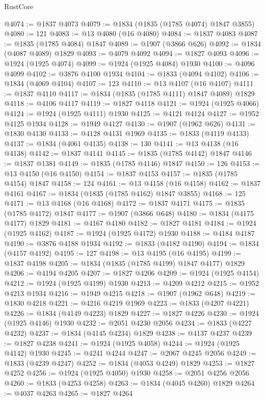 \begin{lexlean}{RustCore}
\begin{coremodule}
@4074 := @1837 @4073
@4079 := @1834 (@1835 (@1785 @4074) @1847 @3855)
@4080 := 121
@4083 := @13 @4080 (@16 @4080)
@4084 := @1837 @4083
@4087 := @1835 (@1785 @4084) @1847
@4089 := @1907 (@3866 @626)
@4092 := @1834 (@4087 @4089) @1829
@4093 := @4079 @4092
@4094 := @1827 @4093
@4096 := @1924 (@1925 @4074)
@4099 := @1924 (@1925 @4084) @1930
@4100 := @4096 @4099
@4102 := @3876 @4100 @1934
@4104 := @1833 (@4094 @4102)
@4106 := @1834 (@4069 @4104)
@4107 := 123
@4110 := @13 @4107 (@16 @4107)
@4111 := @1837 @4110
@4117 := @1834 (@1835 (@1785 @4111) @1847 @4089) @1829
@4118 := @4106 @4117
@4119 := @1827 @4118
@4121 := @1924 (@1925 @4066)
@4124 := @1924 (@1925 @4111) @1930
@4125 := @4121 @4124
@4127 := @1952 @4125 @1934
@4128 := @1949 @4127
@4130 := @1907 (@1962 @626)
@4131 := @1830 @4130
@4133 := @4128 @4131 @1969
@4135 := @1833 (@4119 @4133)
@4137 := @1834 (@4061 @4135)
@4138 := 130
@4141 := @13 @4138 (@16 @4138)
@4142 := @1837 @4141
@4145 := @1835 (@1785 @4142) @1847
@4146 := @1837 @1381
@4149 := @1835 (@1785 @4146) @1847
@4150 := 126
@4153 := @13 @4150 (@16 @4150)
@4154 := @1837 @4153
@4157 := @1835 (@1785 @4154) @1847
@4158 := 124
@4161 := @13 @4158 (@16 @4158)
@4162 := @1837 @4161
@4167 := @1834 (@1835 (@1785 @4162) @1847 @3855)
@4168 := 125
@4171 := @13 @4168 (@16 @4168)
@4172 := @1837 @4171
@4175 := @1835 (@1785 @4172) @1847
@4177 := @1907 (@3866 @648)
@4180 := @1834 (@4175 @4177) @1829
@4181 := @4167 @4180
@4182 := @1827 @4181
@4184 := @1924 (@1925 @4162)
@4187 := @1924 (@1925 @4172) @1930
@4188 := @4184 @4187
@4190 := @3876 @4188 @1934
@4192 := @1833 (@4182 @4190)
@4194 := @1834 (@4157 @4192)
@4195 := 127
@4198 := @13 @4195 (@16 @4195)
@4199 := @1837 @4198
@4205 := @1834 (@1835 (@1785 @4199) @1847 @4177) @1829
@4206 := @4194 @4205
@4207 := @1827 @4206
@4209 := @1924 (@1925 @4154)
@4212 := @1924 (@1925 @4199) @1930
@4213 := @4209 @4212
@4215 := @1952 @4213 @1934
@4216 := @1949 @4215
@4218 := @1907 (@1962 @648)
@4219 := @1830 @4218
@4221 := @4216 @4219 @1969
@4223 := @1833 (@4207 @4221)
@4226 := @1834 (@4149 @4223) @1829
@4227 := @1827 @4226
@4230 := @1924 (@1925 @4146) @1930
@4232 := @2051 @4230 @2056
@4234 := @1833 (@4227 @4232)
@4237 := @1834 (@4145 @4234) @1829
@4238 := @4137 @4237
@4239 := @1827 @4238
@4241 := @1924 (@1925 @4058)
@4244 := @1924 (@1925 @4142) @1930
@4245 := @4241 @4244
@4247 := @2067 @4245 @2056
@4249 := @1833 (@4239 @4247)
@4252 := @1834 (@4053 @4249) @1829
@4253 := @1827 @4252
@4256 := @1924 (@1925 @4050) @1930
@4258 := @2051 @4256 @2056
@4260 := @1833 (@4253 @4258)
@4263 := @1834 (@4045 @4260) @1829
@4264 := @4037 @4263
@4265 := @1827 @4264

\end{coremodule}
\end{lexlean}
